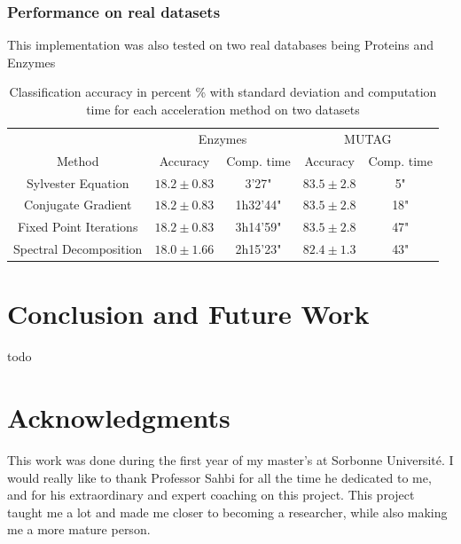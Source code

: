 \documentclass{article}
\theoremstyle{definition}
\begin{document}
\subsubsection{Performance on real datasets}
This implementation was also tested on two real databases being Proteins and Enzymes
\begin{table}[!htb]
	\begin{center}
		\begin{tabular}{|c||c|c||c|c|}
			\hline
			& \multicolumn{2}{c||}{Enzymes} & \multicolumn{2}{|c|}{MUTAG}\\
			\cline{2-5}
			Method & Accuracy  & Comp. time & Accuracy & Comp. time\\
			\hline 
			Sylvester Equation & $18.2\pm 0.83$ & 3'27" & $83.5\pm 2.8$ & 5"\\
			Conjugate Gradient & $18.2\pm 0.83$ & 1h32'44" & $83.5\pm 2.8$ & 18"\\
			Fixed Point Iterations & $18.2\pm 0.83$ & 3h14'59" & $83.5\pm 2.8$ & 47" \\
			Spectral Decomposition & $18.0\pm 1.66$ & 2h15'23" & $82.4\pm 1.3$ & 43"\\
			\hline
		\end{tabular}
	\end{center}
\caption{Classification accuracy in percent \% with standard deviation and computation time for each acceleration method on two datasets}
\end{table}

\section{Conclusion and Future Work}
todo

\section*{Acknowledgments}
This work was done during the first year of my master's at Sorbonne Université. I would really like to thank Professor Sahbi for all the time he dedicated to me, and for his extraordinary and expert coaching on this project. This project taught me a lot and made me closer to becoming a researcher, while also making me a more mature person.
\end{document}
